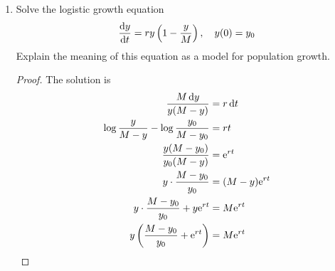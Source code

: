\documentclass[../psets.tex]{subfiles}
\begin{document}
\begin{enumerate}
\begin{proof}
\begin{equation*}
            \frac{1}{g(y)}\cdot\dv{y}{t} = f(t)
        \end{equation*}
        Define $\dv*{H}{y}=1/g(y)$. Then, continuing from the above, we have by the law of composite differentiation that
        \begin{align*}
            \dv{H}{y}\cdot\dv{y}{t} &= f(t)\\
            \dv{H}{t} &= f(t)
        \end{align*}
        From the definition of $H$, we know that $H(y)=\int_{y_0}^f\dd{w}/g(w)$. We also have from the FTC that $f(t)=\dv{t}\int_{t_0}^tf(\tau)\dd\tau$. Thus, continuing from the above, we have that
        \begin{align*}
            \dv{t}(H) &= f(t)\\
            \dv{t}\left[ \int_{y_0}^f\frac{\dd{w}}{g(w)} \right] &= \dd{t}\int_{t_0}^tf(\tau)\dd\tau\\
            \dv{t}\left[ \int_{y_0}^{y(t)}\frac{\dd{w}}{g(w)}-\int_{t_0}^tf(\tau)\dd\tau \right] &= 0
        \end{align*}
        It follows since $y(t_0)=y_0$ that $C=H(y_0)=0$, so we can take the above to
        \begin{equation*}
            \int_{y_0}^{y(t)}\frac{\dd{w}}{g(w)} = \int_{t_0}^tf(\tau)\dd\tau
        \end{equation*}
        knowing that our constant of integration is zero.
    \end{proof}
    \item Solve the logistic growth equation
    \begin{equation*}
        \dv{y}{t} = ry\left( 1-\frac{y}{M} \right)
        ,\quad
        y(0) = y_0
    \end{equation*}
    Explain the meaning of this equation as a model for population growth.
    \begin{proof}
        The solution is
        \begin{align*}
            \frac{M\dd{y}}{y(M-y)} &= r\dd{t}\\
            \log\frac{y}{M-y}-\log\frac{y_0}{M-y_0} &= rt\\
            \frac{y(M-y_0)}{y_0(M-y)} &= \e[rt]\\
            y\cdot\frac{M-y_0}{y_0} &= (M-y)\e[rt]\\
            y\cdot\frac{M-y_0}{y_0}+y\e[rt] &= M\e[rt]\\
            y\left( \frac{M-y_0}{y_0}+\e[rt] \right) &= M\e[rt]\\

\end{align*}
\end{proof}
\end{enumerate}
\end{document}
